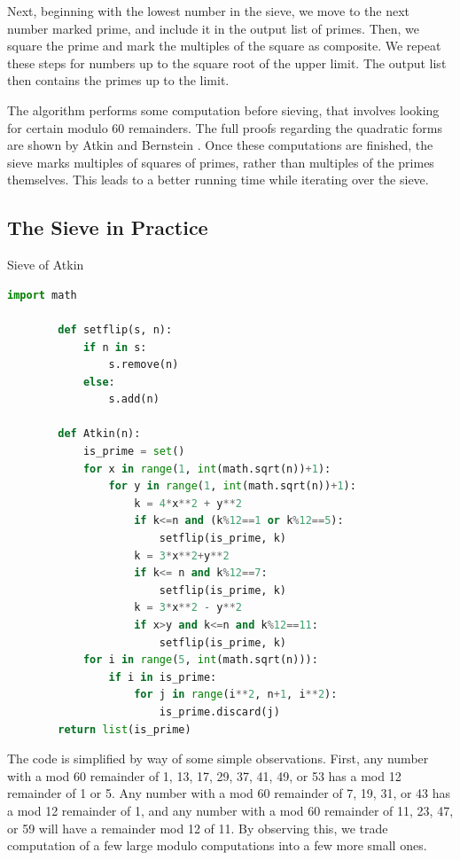 \documentclass{amsart}
\theoremstyle{definition}
\theoremstyle{case}
\begin{document}
	Next, beginning with the lowest number in the sieve, we move to the next number marked prime, and include it in the output list of primes. Then, we square the prime and mark the multiples of the square as composite. We repeat these steps for numbers up to the square root of the upper limit. The output list then contains the primes up to the limit.
	
	The algorithm performs some computation before sieving, that involves looking for certain modulo 60 remainders. The full proofs regarding the quadratic forms are shown by Atkin and Bernstein \cite[p.~1028]{MR2031423}. Once these computations are finished, the sieve marks multiples of squares of primes, rather than multiples of the primes themselves. This leads to a better running time while iterating over the sieve.
	
	\subsection{The Sieve in Practice}
	
	\begin{Algorithm}[H]\caption{Sieve of Atkin}
		\begin{lstlisting}[language=Python]
        import math
        
        def setflip(s, n):
            if n in s:
                s.remove(n)
            else:
                s.add(n)
        
		def Atkin(n):
            is_prime = set()
            for x in range(1, int(math.sqrt(n))+1):
                for y in range(1, int(math.sqrt(n))+1):
                    k = 4*x**2 + y**2
                    if k<=n and (k%12==1 or k%12==5):
                        setflip(is_prime, k)
                    k = 3*x**2+y**2
                    if k<= n and k%12==7:
                        setflip(is_prime, k)
                    k = 3*x**2 - y**2
                    if x>y and k<=n and k%12==11:
                        setflip(is_prime, k)
            for i in range(5, int(math.sqrt(n))):
                if i in is_prime:
                    for j in range(i**2, n+1, i**2):
                        is_prime.discard(j)
        return list(is_prime)
		\end{lstlisting}
	\end{Algorithm}
	
	The code is simplified by way of some simple observations. First, any number with a mod 60 remainder of 1, 13, 17, 29, 37, 41, 49, or 53 has a mod 12 remainder of 1 or 5. Any number with a mod 60 remainder of 7, 19, 31, or 43 has a mod 12 remainder of 1, and any number with a mod 60 remainder of 11, 23, 47, or 59 will have a remainder mod 12 of 11. By observing this, we trade computation of a few large modulo computations into a few more small ones.
	
\end{document}
